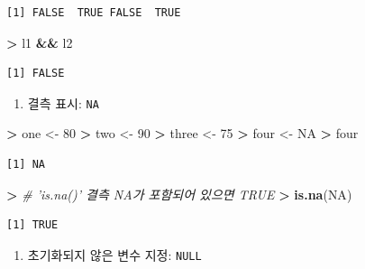 \documentclass[12pt,a4paper]{book}
\newenvironment{Shaded}{\begin{snugshade}}{\end{snugshade}}
\newcommand{\KeywordTok}[1]{\textcolor[rgb]{0.13,0.29,0.53}{\textbf{#1}}}
\newcommand{\DecValTok}[1]{\textcolor[rgb]{0.00,0.00,0.81}{#1}}
\newcommand{\StringTok}[1]{\textcolor[rgb]{0.31,0.60,0.02}{#1}}
\newcommand{\CommentTok}[1]{\textcolor[rgb]{0.56,0.35,0.01}{\textit{#1}}}
\newcommand{\OtherTok}[1]{\textcolor[rgb]{0.56,0.35,0.01}{#1}}
\newcommand{\OperatorTok}[1]{\textcolor[rgb]{0.81,0.36,0.00}{\textbf{#1}}}
\newcommand{\ErrorTok}[1]{\textcolor[rgb]{0.64,0.00,0.00}{\textbf{#1}}}
\newcommand{\NormalTok}[1]{#1}
\providecommand{\tightlist}{%
  \setlength{\itemsep}{0pt}\setlength{\parskip}{0pt}}
\theoremstyle{definition}
\theoremstyle{definition}
\theoremstyle{definition}
\theoremstyle{remark}
\begin{document}
\begin{verbatim}
[1] FALSE  TRUE FALSE  TRUE
\end{verbatim}

\begin{Shaded}
\begin{Highlighting}[]
\OperatorTok{>}\StringTok{ }\NormalTok{l1 }\OperatorTok{&&}\StringTok{ }\NormalTok{l2}
\end{Highlighting}
\end{Shaded}

\begin{verbatim}
[1] FALSE
\end{verbatim}

\begin{enumerate}
\def\labelenumi{\arabic{enumi}.}
\setcounter{enumi}{2}
\tightlist
\item
  결측 표시: \texttt{NA}
\end{enumerate}

\begin{Shaded}
\begin{Highlighting}[]
\OperatorTok{>}\StringTok{ }\NormalTok{one <-}\StringTok{ }\DecValTok{80}
\OperatorTok{>}\StringTok{ }\NormalTok{two <-}\StringTok{ }\DecValTok{90}
\OperatorTok{>}\StringTok{ }\NormalTok{three <-}\StringTok{ }\DecValTok{75}
\OperatorTok{>}\StringTok{ }\NormalTok{four <-}\StringTok{ }\OtherTok{NA}
\OperatorTok{>}\StringTok{ }\NormalTok{four}
\end{Highlighting}
\end{Shaded}

\begin{verbatim}
[1] NA
\end{verbatim}

\begin{Shaded}
\begin{Highlighting}[]
\OperatorTok{>}\StringTok{ }\CommentTok{# 'is.na()' 결측 NA가 포함되어 있으면 TRUE}
\ErrorTok{>}\StringTok{ }\KeywordTok{is.na}\NormalTok{(}\OtherTok{NA}\NormalTok{)}
\end{Highlighting}
\end{Shaded}

\begin{verbatim}
[1] TRUE
\end{verbatim}

\begin{enumerate}
\def\labelenumi{\arabic{enumi}.}
\setcounter{enumi}{3}
\tightlist
\item
  초기화되지 않은 변수 지정: \texttt{NULL}
\end{enumerate}
\end{document}
